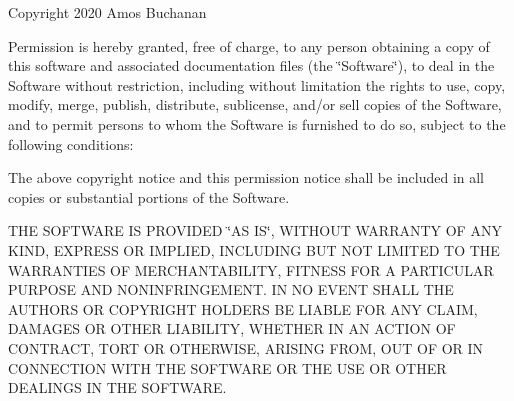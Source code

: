 Copyright 2020 Amos Buchanan

Permission is hereby granted, free of charge, to any person obtaining a copy of this software and associated documentation files (the \char`\"{}\+Software\char`\"{}), to deal in the Software without restriction, including without limitation the rights to use, copy, modify, merge, publish, distribute, sublicense, and/or sell copies of the Software, and to permit persons to whom the Software is furnished to do so, subject to the following conditions\+:

The above copyright notice and this permission notice shall be included in all copies or substantial portions of the Software.

T\+HE S\+O\+F\+T\+W\+A\+RE IS P\+R\+O\+V\+I\+D\+ED \char`\"{}\+A\+S I\+S\char`\"{}, W\+I\+T\+H\+O\+UT W\+A\+R\+R\+A\+N\+TY OF A\+NY K\+I\+ND, E\+X\+P\+R\+E\+SS OR I\+M\+P\+L\+I\+ED, I\+N\+C\+L\+U\+D\+I\+NG B\+UT N\+OT L\+I\+M\+I\+T\+ED TO T\+HE W\+A\+R\+R\+A\+N\+T\+I\+ES OF M\+E\+R\+C\+H\+A\+N\+T\+A\+B\+I\+L\+I\+TY, F\+I\+T\+N\+E\+SS F\+OR A P\+A\+R\+T\+I\+C\+U\+L\+AR P\+U\+R\+P\+O\+SE A\+ND N\+O\+N\+I\+N\+F\+R\+I\+N\+G\+E\+M\+E\+NT. IN NO E\+V\+E\+NT S\+H\+A\+LL T\+HE A\+U\+T\+H\+O\+RS OR C\+O\+P\+Y\+R\+I\+G\+HT H\+O\+L\+D\+E\+RS BE L\+I\+A\+B\+LE F\+OR A\+NY C\+L\+A\+IM, D\+A\+M\+A\+G\+ES OR O\+T\+H\+ER L\+I\+A\+B\+I\+L\+I\+TY, W\+H\+E\+T\+H\+ER IN AN A\+C\+T\+I\+ON OF C\+O\+N\+T\+R\+A\+CT, T\+O\+RT OR O\+T\+H\+E\+R\+W\+I\+SE, A\+R\+I\+S\+I\+NG F\+R\+OM, O\+UT OF OR IN C\+O\+N\+N\+E\+C\+T\+I\+ON W\+I\+TH T\+HE S\+O\+F\+T\+W\+A\+RE OR T\+HE U\+SE OR O\+T\+H\+ER D\+E\+A\+L\+I\+N\+GS IN T\+HE S\+O\+F\+T\+W\+A\+RE. 